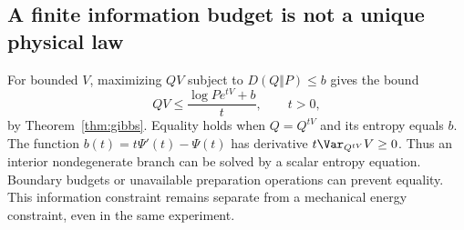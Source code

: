 \subsection{A finite information budget is not a unique physical law}
For bounded $V$, maximizing $QV$ subject to $D(Q\Vert P)\le b$ gives the bound
\[
 QV\le\frac{\log Pe^{tV}+b}{t},\qquad t>0,
\]
by Theorem~\ref{thm:gibbs}. Equality holds when $Q=Q^{tV}$ and its entropy equals $b$. The function $b(t)=t\Psi'(t)-\Psi(t)$ has derivative $t\Var_{Q^{tV}}V\ge0$. Thus an interior nondegenerate branch can be solved by a scalar entropy equation. Boundary budgets or unavailable preparation operations can prevent equality. This information constraint remains separate from a mechanical energy constraint, even in the same experiment.
\par
